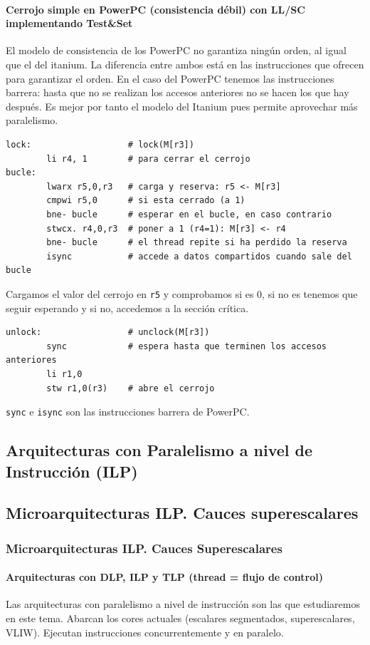 \documentclass[10pt,a4paper,spanish]{report}
\begin{document}
\textcolor{azul}{\subsubsection{Cerrojo simple en PowerPC (consistencia débil) con LL/SC implementando Test\&Set}}
El modelo de consistencia de los PowerPC no garantiza ningún orden, al igual que el del itanium. La diferencia entre ambos está en las instrucciones que ofrecen para garantizar el orden. En el caso del PowerPC tenemos las instrucciones barrera:  hasta que no se realizan los accesos anteriores no se hacen los que hay después. Es mejor por tanto el modelo del Itanium pues permite aprovechar más paralelismo.

\begin{verbatim}
lock:                   # lock(M[r3])
        li r4, 1        # para cerrar el cerrojo
bucle:
        lwarx r5,0,r3   # carga y reserva: r5 <- M[r3]
        cmpwi r5,0      # si esta cerrado (a 1)
        bne- bucle      # esperar en el bucle, en caso contrario
        stwcx. r4,0,r3  # poner a 1 (r4=1): M[r3] <- r4
        bne- bucle      # el thread repite si ha perdido la reserva
        isync           # accede a datos compartidos cuando sale del bucle
\end{verbatim}

Cargamos el valor del cerrojo en \verb*|r5| y comprobamos si es 0, si no es tenemos que seguir esperando y si no, accedemos a la sección crítica.

\begin{verbatim}
unlock:                 # unclock(M[r3])
        sync            # espera hasta que terminen los accesos anteriores
        li r1,0
        stw r1,0(r3)    # abre el cerrojo
\end{verbatim}

\verb*|sync| e \verb*|isync| son las instrucciones barrera de PowerPC.

\textcolor{azul}{\chapter{Arquitecturas con Paralelismo a nivel de Instrucción (ILP)}}
\setcounter{section}{10}
\textcolor{azul}{\section{Microarquitecturas ILP. Cauces superescalares}}
\textcolor{azul}{\subsection{Microarquitecturas ILP. Cauces Superescalares}}
\textcolor{azul}{\subsubsection{Arquitecturas con DLP, ILP y TLP (thread = flujo de control)}}
Las arquitecturas con paralelismo a nivel de instrucción son las que estudiaremos en este tema. Abarcan los cores actuales (escalares segmentados, superescalares, VLIW). Ejecutan instrucciones concurrentemente y en paralelo.
\end{document}
